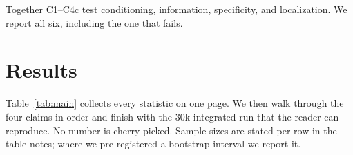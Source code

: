 \documentclass[11pt,a4paper]{article}
\begin{document}
Together C1--C4c test conditioning, information, specificity, and localization. We report all six, including the one that fails.

\section{Results}
\label{sec:results}

Table~\ref{tab:main} collects every statistic on one page. We then walk through the four claims in order and finish with the 30k integrated run that the reader can reproduce. No number is cherry-picked. Sample sizes are stated per row in the table notes; where we pre-registered a bootstrap interval we report it.

\begin{table}[h]
\centering
\caption{All outcomes. Sample sizes are stated in the table notes (detection/habituation/persistence/H5-bis/$\Phi$: $N=30$ seeds; C1--C4c: single-seed pilots). CI is 95\% bootstrap (2,000 resamples). $d$ is Cohen's $d$. The negative result (C3) is included.}
\label{tab:main}
\end{table}
\end{document}
